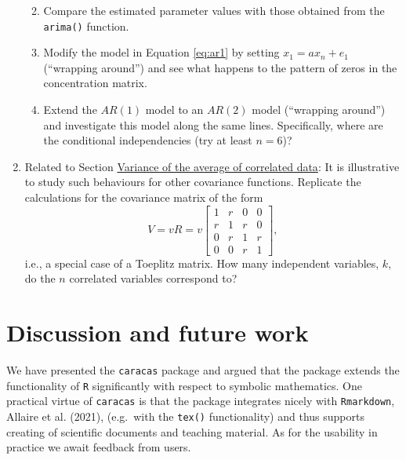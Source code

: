 \begin{enumerate}
  \begin{enumerate}
  \def\labelenumii{\alph{enumii})}
  \tightlist
  \item
    Compare the estimated parameter values with those obtained from
    the \texttt{arima()} function.
  \item
    Modify the model in Equation \eqref{eq:ar1} by
    setting \(x_1 = a x_n + e_1\) (``wrapping around'') and see what happens
    to the pattern of zeros in the concentration matrix.
  \item
    Extend the
    \(AR(1)\) model to an \(AR(2)\) model (``wrapping around'') and
    investigate this model along the same lines. Specifically,
    where are the conditional independencies (try at least \(n=6\))?
  \end{enumerate}
\item
  Related to Section \protect\hyperlink{variance-of-the-average-of-correlated-data}{Variance of the average of correlated data}: It
  is illustrative to study such behaviours for other covariance
  functions.
  Replicate the calculations for the covariance matrix of the form
  \begin{equation}
    \label{eq:ex5}
    V = v R = v \left[\begin{matrix}1 & r & 0 & 0\\r & 1 & r & 0\\0 & r & 1 & r\\0 & 0 & r & 1\end{matrix}\right],
  \end{equation}
  i.e., a special case of a Toeplitz matrix.
  How many independent variables, \(k\), do
  the \(n\) correlated variables correspond to?
\end{enumerate}

\hypertarget{discussion-and-future-work}{%
\section{Discussion and future work}\label{discussion-and-future-work}}

We have presented the \texttt{caracas} package and argued that the
package extends the functionality of \texttt{R} significantly with respect to
symbolic mathematics. One practical virtue of \texttt{caracas} is
that the package integrates nicely with \texttt{Rmarkdown},
Allaire et al. (2021), (e.g.~with the \texttt{tex()} functionality) and thus
supports creating of scientific documents and teaching material. As
for the usability in practice we await feedback from users.

